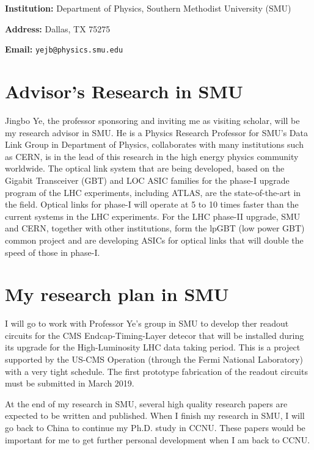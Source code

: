 \documentclass[11pt,a4paper]{article}
\begin{document}
\begin{spacing}{1.2}
\begin{multicols}{2}

\textbf{Institution:} Department of Physics, Southern Methodist University (SMU)

\textbf{Address:} Dallas, TX 75275 
 
\textbf{Email:} \texttt{yejb@physics.smu.edu} 

\end{multicols}

\section*{Advisor's Research in SMU}     %
Jingbo Ye, the professor sponsoring and inviting me as visiting scholar, will be my research advisor in SMU. He is a Physics Research Professor for SMU's Data Link Group in Department of Physics, collaborates with many institutions such as CERN, is in the lead of this research in the high energy physics community worldwide. The optical link system that are being developed, based on the Gigabit Transceiver (GBT) and LOC ASIC families for the phase-I upgrade program of the LHC experiments, including ATLAS, are the state-of-the-art in the field. Optical links for phase-I will operate at 5 to 10 times faster than the current systems in the LHC experiments. For the LHC phase-II upgrade, SMU and CERN, together with other institutions, form the lpGBT (low power GBT) common project and are developing ASICs for optical links that will double the speed of those in phase-I.

\section*{My research plan in SMU}     %
I will go to work with Professor Ye's group in SMU to develop ther readout circuits for the CMS Endcap-Timing-Layer detecor that will be installed during its upgrade for the High-Luminosity LHC data taking period. This is a project supported by the US-CMS Operation (through the Fermi National Laboratory) with a very tight schedule. The first prototype fabrication of the readout circuits must be submitted in March 2019.

At the end of my research in SMU, several high quality research papers are expected to be written and published. When I finish my research in SMU, I will go back to China to continue my Ph.D. study in CCNU. These papers would be important for me to get further personal development when I am back to CCNU.



\end{spacing}
\end{document}
